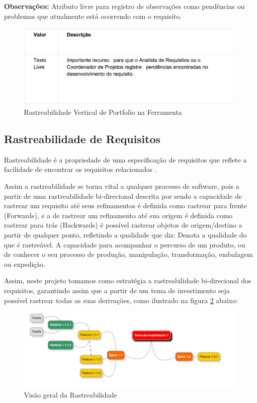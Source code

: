 \textbf{Observações:} Atributo livre para registro de observações como pendências
ou problemas que atualmente está ocorrendo com o requisito.

\begin{figure}[H]
    \centering
	\includegraphics[keepaspectratio=true,scale=0.7]{figuras/atr6.eps}
    \caption{ Rastreabilidade Vertical de Portfolio na Ferramenta}
    \label{fig:ras}
\end{figure}

\subsection{Rastreabilidade de Requisitos}

Rastreabilidade é a propriedade de uma especificação de requisitos que reflete a facilidade
de encontrar os requisitos relacionados \cite{sommerville2007}.

Assim a rastreabilidade se torna vital a qualquer processo de software,
pois a partir de uma rastreabilidade bi-direcional descrita por \cite{DAVIS} sendo
a capacidade de rastrear um requisito até seus refinamentos é definida como rastrear
para frente (Forwards), e a de rastrear um refinamento até sua origem é definida como
rastrear para trás (Backwards) é possível rastrear objetos de origem/destino a partir de
qualquer ponto, refletindo a qualidade que \cite{PRIBERAM} diz: Denota a qualidade do
que é rastreável. A capacidade para acompanhar o percurso de um produto, ou de conhecer
o seu processo de produção, manipulação, transformação, embalagem ou expedição.

Assim, neste projeto tomamos como estratégia a rastreabilidade bi-direcional dos
requisitos, garantindo assim que a partir de um tema de investimento seja possível
rastrear todas as suas derivações, como ilustrado na figura \ref{fig:ras1} abaixo:

\begin{figure}[H]
    \centering
	\includegraphics[keepaspectratio=true,scale=0.75]{figuras/rast1.eps}
    \caption{Visão geral da Rastreabilidade}
    \label{fig:ras1}
\end{figure}

